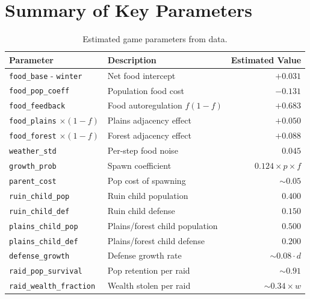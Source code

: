 \documentclass[11pt,a4paper]{article}
\begin{document}
\section{Summary of Key Parameters}
\label{sec:params}

\begin{table}[H]
\centering
\caption{Estimated game parameters from data.}
\begin{tabular}{llr}
\toprule
Parameter & Description & Estimated Value \\
\midrule
\texttt{food\_base} - \texttt{winter} & Net food intercept & $+0.031$ \\
\texttt{food\_pop\_coeff} & Population food cost & $-0.131$ \\
\texttt{food\_feedback} & Food autoregulation $f(1{-}f)$ & $+0.683$ \\
\texttt{food\_plains} $\times (1{-}f)$ & Plains adjacency effect & $+0.050$ \\
\texttt{food\_forest} $\times (1{-}f)$ & Forest adjacency effect & $+0.088$ \\
\texttt{weather\_std} & Per-step food noise & $0.045$ \\
\texttt{growth\_prob} & Spawn coefficient & $0.124 \times p \times f$ \\
\texttt{parent\_cost} & Pop cost of spawning & $\sim 0.05$ \\
\texttt{ruin\_child\_pop} & Ruin child population & $0.400$ \\
\texttt{ruin\_child\_def} & Ruin child defense & $0.150$ \\
\texttt{plains\_child\_pop} & Plains/forest child population & $0.500$ \\
\texttt{plains\_child\_def} & Plains/forest child defense & $0.200$ \\
\texttt{defense\_growth} & Defense growth rate & $\sim 0.08 \cdot d$ \\
\texttt{raid\_pop\_survival} & Pop retention per raid & $\sim 0.91$ \\
\texttt{raid\_wealth\_fraction} & Wealth stolen per raid & $\sim 0.34 \times w$ \\
\bottomrule
\end{tabular}
\label{tab:params}
\end{table}
\end{document}
